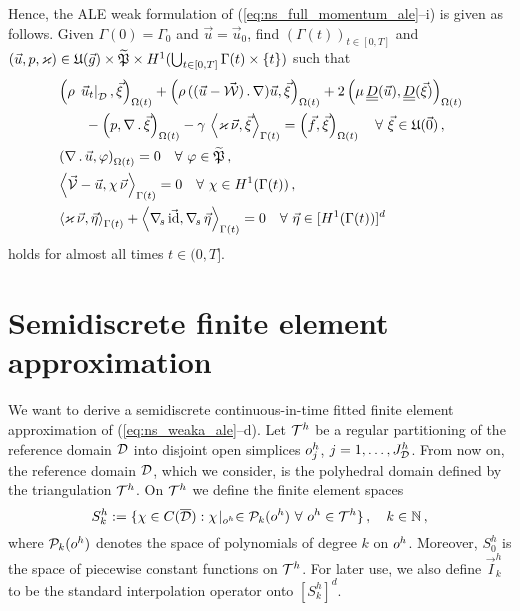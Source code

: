 Hence, the ALE weak formulation of (\ref{eq:ns_full_momentum_ale}--i)
is given as follows. Given $\Gamma(0) = \Gamma_0$ and
$\vec u = \vec u_0$,
find $(\Gamma(t))_{t\in[0,T]}$ and
$(\vec u, p, \varkappa)\in \mathfrak{U}(\vec{g}) \times \widetilde{\mathfrak{P}} \times
H^1(\bigcup_{t\in[0,T]} \Gamma(t) \times \{t\})$
such that
\begin{subequations}
\begin{align}
& \left(\rho\,\left.\vec u_t\right|_{\D}, \vec \xi\right)_{\Omega(t)} +
\left(\rho\,((\vec u - \W)\,.\, \nabla )\vec u,\vec \xi\right)_{\Omega(t)}
+ 2\left(\mu\,\mat D(\vec u), \mat D(\vec \xi)\right)_{\Omega(t)} \nonumber \\
& \qquad - \left(p, \nabla\,.\,\vec \xi\right)_{\Omega(t)}
- \gamma\,\left\langle \varkappa\,\vec\nu, \vec\xi\right\rangle_{\Gamma(t)}
= \left(\vec f, \vec \xi\right)_{\Omega(t)}\quad \forall\ \vec\xi \in
\uspaceale 0 \,, \label{eq:ns_weaka_ale}\\
& \left(\nabla\,.\,\vec u, \varphi\right)_{\Omega(t)} = 0
\quad \forall\ \varphi \in \pnormspaceale\,, \label{eq:ns_weakb_ale} \\
&  \left\langle \V
- \vec u, \chi\,\vec\nu \right\rangle_{\Gamma(t)} = 0
\quad \forall\ \chi \in H^1(\Gamma(t))\,, \label{eq:ns_weakc_ale} \\
& \left\langle \varkappa\,\vec\nu, \vec\eta \right\rangle_{\Gamma(t)}
+ \left\langle \nabs\,\vec \id, \nabs\,\vec \eta \right\rangle_{\Gamma(t)}
= 0  \quad \forall\ \vec\eta \in [H^1(\Gamma(t))]^d\,\label{eq:ns_weakd_ale}
\end{align}
\end{subequations}
holds for almost all times $t \in (0,T]$.

\section{Semidiscrete finite element approximation}\label{sec:ale_semi_fem}
We want to derive a semidiscrete continuous-in-time fitted finite element
approximation of (\ref{eq:ns_weaka_ale}--d). Let ${\cal T}^h$ be a regular
partitioning of the reference domain $\mathcal D$ into disjoint open simplices
$o^h_j$, $j = 1 ,\ldots, J^h_\mathcal D$. From now on, the reference domain $\mathcal D$,
which we consider, is the polyhedral domain defined by the triangulation
${\cal T}^h$. On ${\cal T}^h$ we define the finite element spaces
\begin{equation*}
S^h_k := \{\chi \in C(\overline{\mathcal D}) : \chi\!\mid_{o^h}
\in \mathcal{P}_k(o^h) \ \forall\ o^h \in {\cal T}^h\}\,,
\quad k \in \mathbb{N}\,,
\end{equation*}
where $\mathcal{P}_k(o^h)$ denotes the space of polynomials of degree $k$
on $o^h$. Moreover, $S^h_0$ is the space of piecewise constant
functions on ${\cal T}^h$. For later use, we also define $\vec I^h_k$ to be
the standard interpolation operator onto $[S^h_k]^d$.

